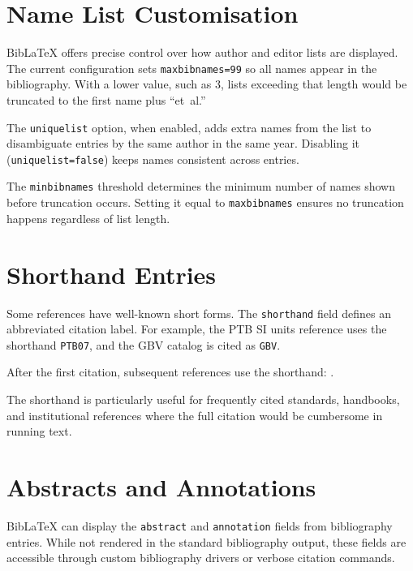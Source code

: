 \documentclass[
    language=english,
    doctype=article,
    institution=none,
]{../../omnilatex}
\begin{document}
\section{Name List Customisation}
\label{sec:name-lists}

BibLaTeX offers precise control over how author and editor lists are
displayed.  The current configuration sets \texttt{maxbibnames=99} so
all names appear in the bibliography.  With a lower value, such as 3,
lists exceeding that length would be truncated to the first name
plus ``et~al.''

The \texttt{uniquelist} option, when enabled, adds extra names from the
list to disambiguate entries by the same author in the same year.
Disabling it (\texttt{uniquelist=false}) keeps names consistent across
entries.

The \texttt{minbibnames} threshold determines the minimum number of names
shown before truncation occurs.  Setting it equal to \texttt{maxbibnames}
ensures no truncation happens regardless of list length.

\section{Shorthand Entries}
\label{sec:shorthand}

Some references have well-known short forms.  The \texttt{shorthand}
field defines an abbreviated citation label.  For example, the PTB SI
units reference uses the shorthand \texttt{PTB07}, and the GBV catalog
is cited as \texttt{GBV}.

After the first citation, subsequent references use the shorthand:
\cite{PTBSI}.

The shorthand is particularly useful for frequently cited standards,
handbooks, and institutional references where the full citation would be
cumbersome in running text.

\section{Abstracts and Annotations}
\label{sec:abstracts}

BibLaTeX can display the \texttt{abstract} and \texttt{annotation} fields
from bibliography entries.  While not rendered in the standard bibliography
output, these fields are accessible through custom bibliography drivers or
verbose citation commands.
\end{document}
